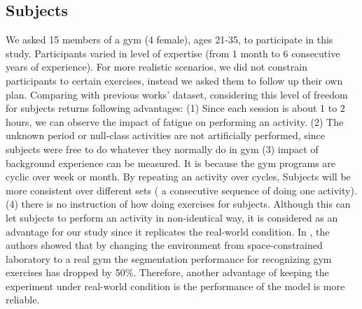 \documentclass[journal,article,submit,moreauthors,pdftex]{Definitions/mdpi}
\begin{document}
\subsection{Subjects}
We asked 15 members of a gym (4 female), ages 21-35, to participate in this study. Participants varied in level of expertise (from 1 month to 6 consecutive years of experience). For more realistic scenarios, we did not constrain participants to certain exercises, instead we asked them to follow up their own plan. Comparing with previous works' dataset, considering this level of freedom for subjects returns following advantages: (1) Since each session is about 1 to 2 hours, we can observe the impact of fatigue on performing an activity. (2) The unknown period or null-class activities are not artificially performed, since subjects were free to do whatever they normally do in gym (3) impact of background experience can be measured. It is because the gym programs are cyclic over week or month. By repeating an activity over cycles, Subjects will be more consistent over different sets ( a consecutive sequence of doing one activity). (4) there is no instruction of how doing exercises for subjects. Although this can let subjects to perform an activity in non-identical way, it is considered as an advantage for our study since it replicates the real-world condition. In \cite{morris2014recofit}, the authors showed that by changing the environment from space-constrained laboratory to a real gym the segmentation performance for recognizing gym exercises has dropped by 50\%. Therefore, another advantage of keeping the experiment under real-world condition is the performance of the model is more reliable.\\
\end{document}
